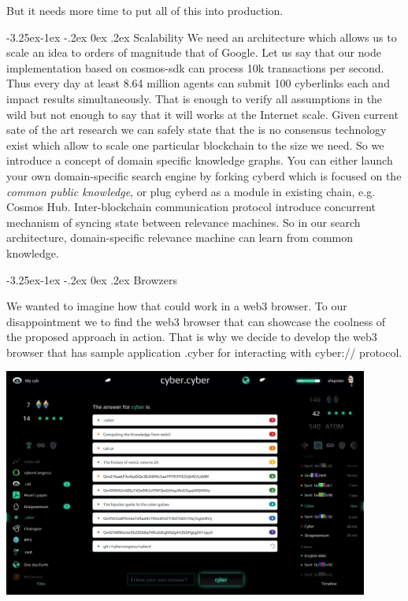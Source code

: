 \documentclass[8pt,oneside]{amsart}
\makeatletter
\newcommand{\linkred}[2]{\href{#1}{\color{red}{#2}}}
\renewcommand\subsection{\@startsection{subsection}{2}{\z@}%
                                     {-3.25ex\@plus -1ex \@minus -.2ex}%
                                     {0ex \@plus .2ex}%
                                     {\play\Large}}%
\newcommand{\titleSection}[1]{\subsection{#1}}
\newcommand{\code}[1]{{\PlayBold #1}}
\newenvironment{Figure}
  {\par\medskip\noindent\minipage{\linewidth}}
  {\endminipage\par\medskip}
\makeatother
\begin{document}
But it needs more time to put all of this into production. 

\titleSection{Scalability}\label{scalability}
We need an architecture which allows us to scale an idea to orders of magnitude that of Google. Let us say that our node implementation based on \code{cosmos-sdk} can process 10k transactions per second. Thus every day at least 8.64 million agents can submit 100 cyberlinks each and impact results simultaneously. That is enough to verify all assumptions in the wild but not enough to say that it will works at the Internet scale. Given current sate of the art research we can safely state that the is no consensus technology exist which allow to scale one particular blockchain to the size we need. So we introduce a concept of domain specific knowledge graphs. You can either launch your own domain-specific search engine by forking cyberd which is focused on the \textit{common public knowledge}, or plug cyberd as a module in existing chain, e.g. Cosmos Hub. Inter-blockchain communication protocol introduce concurrent mechanism of syncing state between relevance machines. So in our search architecture, domain-specific relevance machine can learn from common knowledge.

\titleSection{Browzers}\label{In-browser implementation}

We wanted to imagine how that could work in a web3 browser. To our disappointment we \linkred{https://github.com/cybercongress/cyb/blob/master/docs/comparison.md}{were not able} to find the web3 browser that can showcase the coolness of the proposed approach in action. That is why we decide to develop the web3 browser \linkred{https://github.com/cybercongress/cyb/blob/master/docs/cyb.md}{cyb} that has sample application .cyber for interacting with \code{cyber://} protocol.

\begin{Figure}
  \medskip
  \centering
  \includegraphics[width=0.9\textwidth]{cyb.jpg}
  \medskip
\end{Figure}
\end{document}
